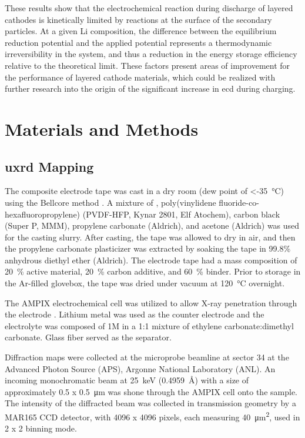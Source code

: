 \documentclass{article}
\begin{document}
These results show that the electrochemical reaction during discharge
of layered cathodes is kinetically limited by reactions at the surface
of the secondary particles. At a given Li composition, the difference
between the equilibrium reduction potential and the applied potential
represents a thermodynamic irreversibility in the system, and thus a
reduction in the energy storage efficiency relative to the theoretical
limit. These factors present areas of improvement for the performance
of layered cathode materials, which could be realized with further
research into the origin of the significant increase in \gls{ecd}
during charging.

\section*{Materials and Methods}
\label{sec:methods}

\subsection*{\gls{uxrd} Mapping}

The \nca{} composite electrode tape was cast in a dry room (dew point
of \SI{<-35}{\celsius}) using the Bellcore method \cite{warren1996}. A
mixture of \nca{}, poly(vinylidene fluoride-co-hexafluoropropylene)
(PVDF-HFP, Kynar 2801, Elf Atochem), carbon black (Super P, MMM),
propylene carbonate (Aldrich), and acetone (Aldrich) was used for the
casting slurry. After casting, the tape was allowed to dry in air, and
then the propylene carbonate plasticizer was extracted by soaking the
tape in 99.8\% anhydrous diethyl ether (Aldrich). The electrode tape
had a mass composition of \SI{20}{\percent} active material,
\SI{20}{\percent} carbon additive, and \SI{60}{\percent} binder. Prior
to storage in the Ar-filled glovebox, the tape was dried under vacuum
at \SI{120}{\celsius} overnight.

The AMPIX electrochemical cell was utilized to allow X-ray penetration
through the electrode \cite{borkiewicz2012}. Lithium metal was used as
the counter electrode and the electrolyte was composed of 1M
 in a 1:1 mixture of ethylene carbonate:dimethyl
carbonate. Glass fiber served as the separator.

Diffraction maps were collected at the microprobe beamline at sector
34 at the Advanced Photon Source (APS), Argonne National Laboratory
(ANL). An incoming monochromatic beam at \SI{25}{\kilo\electronvolt}
(\SI{0.4959}{\angstrom}) with a size of approximately \num{0.5} x
\SI{0.5}{\micro\meter} was shone through the AMPIX cell onto the
sample. The intensity of the diffracted beam was collected in
transmission geometry by a MAR165 CCD detector, with 4096 x 4096
pixels, each measuring \SI{40}{\square\micro\meter}, used in 2 x 2
binning mode.
\end{document}

